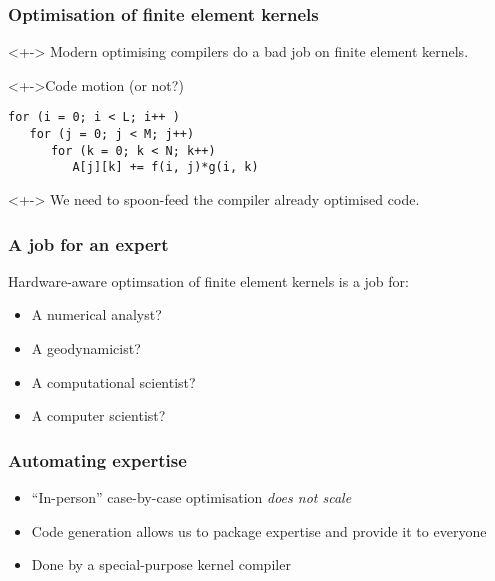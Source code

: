 \documentclass[presentation]{beamer}
\begin{document}
\begin{frame}[fragile]
  \frametitle{Optimisation of finite element kernels}
  
  \begin{problem}<+->
    Modern optimising compilers do a bad job on finite element
    kernels.
  \end{problem}
  \begin{exampleblock}<+->{Code motion (or not?)}
\begin{verbatim}
for (i = 0; i < L; i++ )
   for (j = 0; j < M; j++)
      for (k = 0; k < N; k++)
         A[j][k] += f(i, j)*g(i, k)
\end{verbatim}
  \end{exampleblock}
  \begin{corollary}<+->
    We need to spoon-feed the compiler already optimised code.
  \end{corollary}
\end{frame}

\begin{frame}
  \frametitle{A job for an expert}
  
  Hardware-aware optimsation of finite element kernels is a job for:
  \begin{itemize}
  \item<2-> A numerical analyst?
  \item<3-> A geodynamicist?
  \item<4-> A computational scientist?
  \item<5-> A computer scientist?
  \end{itemize}
\end{frame}

\begin{frame}
  \frametitle{Automating expertise}
  \begin{itemize}
  \item ``In-person'' case-by-case optimisation \emph{does not scale}
  \item Code generation allows us to package expertise and provide it
    to everyone
  \item Done by a special-purpose kernel compiler
  \end{itemize}
\end{frame}
\end{document}
